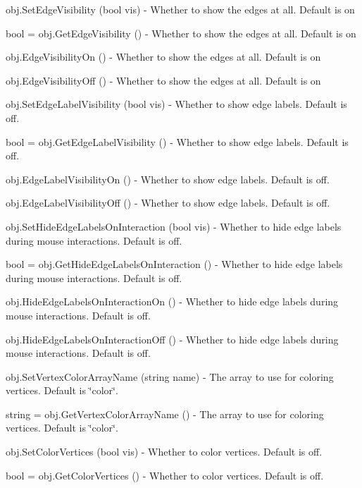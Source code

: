 \begin{DoxyItemize}
\item {\ttfamily obj.\-Set\-Edge\-Visibility (bool vis)} -\/ Whether to show the edges at all. Default is on  
\item {\ttfamily bool = obj.\-Get\-Edge\-Visibility ()} -\/ Whether to show the edges at all. Default is on  
\item {\ttfamily obj.\-Edge\-Visibility\-On ()} -\/ Whether to show the edges at all. Default is on  
\item {\ttfamily obj.\-Edge\-Visibility\-Off ()} -\/ Whether to show the edges at all. Default is on  
\item {\ttfamily obj.\-Set\-Edge\-Label\-Visibility (bool vis)} -\/ Whether to show edge labels. Default is off.  
\item {\ttfamily bool = obj.\-Get\-Edge\-Label\-Visibility ()} -\/ Whether to show edge labels. Default is off.  
\item {\ttfamily obj.\-Edge\-Label\-Visibility\-On ()} -\/ Whether to show edge labels. Default is off.  
\item {\ttfamily obj.\-Edge\-Label\-Visibility\-Off ()} -\/ Whether to show edge labels. Default is off.  
\item {\ttfamily obj.\-Set\-Hide\-Edge\-Labels\-On\-Interaction (bool vis)} -\/ Whether to hide edge labels during mouse interactions. Default is off.  
\item {\ttfamily bool = obj.\-Get\-Hide\-Edge\-Labels\-On\-Interaction ()} -\/ Whether to hide edge labels during mouse interactions. Default is off.  
\item {\ttfamily obj.\-Hide\-Edge\-Labels\-On\-Interaction\-On ()} -\/ Whether to hide edge labels during mouse interactions. Default is off.  
\item {\ttfamily obj.\-Hide\-Edge\-Labels\-On\-Interaction\-Off ()} -\/ Whether to hide edge labels during mouse interactions. Default is off.  
\item {\ttfamily obj.\-Set\-Vertex\-Color\-Array\-Name (string name)} -\/ The array to use for coloring vertices. Default is \char`\"{}color\char`\"{}.  
\item {\ttfamily string = obj.\-Get\-Vertex\-Color\-Array\-Name ()} -\/ The array to use for coloring vertices. Default is \char`\"{}color\char`\"{}.  
\item {\ttfamily obj.\-Set\-Color\-Vertices (bool vis)} -\/ Whether to color vertices. Default is off.  
\item {\ttfamily bool = obj.\-Get\-Color\-Vertices ()} -\/ Whether to color vertices. Default is off.  

\end{DoxyItemize}
